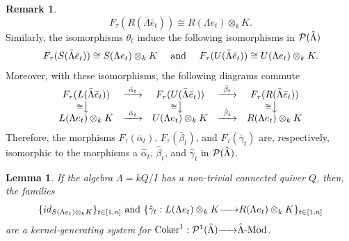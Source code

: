 \documentclass{article}
\newtheorem{lemma}[theorem]{Lemma}
\theoremstyle{definition}
\newtheorem{remark}[theorem]{Remark}
\newcommand{\Coker}{{ \rm Coker }}
\newcommand{\Mod}{{ \rm Mod }}
\newcommand{\g}{\hbox{-}}
\newcommand{\rightmap}[1]{\smash{\mathop{\hbox to 
20pt{\rightarrowfill}}\limits^{#1}}}
\newcommand{\shortlmapdown}[1]
{\llap{$\vcenter{\hbox{$\scriptstyle#1$}}$}\big\downarrow}
\begin{document}
\begin{remark}
$$F_\tau(R(\bar{\Lambda}\bar{e}_t))\cong  
R(\Lambda e_t)\otimes_k K. 
$$
 Similarly, the isomorphisms $\theta_t$ induce the following isomorphisms in ${\cal P}(\hat{\Lambda})$ 
$$F_\tau(S(\bar{\Lambda}\bar{e}_t))\cong S(\Lambda e_t)\otimes_k K \hbox{ \ \ \ and \ \ \ } F_\tau(U(\bar{\Lambda}\bar{e}_t))\cong U(\Lambda e_t)\otimes_k K.$$ Moreover, with these isomorphisms, the following diagrams  commute 
$$\begin{matrix}F_\tau(L(\bar{\Lambda}\bar{e}_t))&\rightmap{\bar{\alpha}_t}&F_\tau(U(\bar{\Lambda}\bar{e}_t))&\rightmap{\bar{\beta}_t}&F_\tau(R(\bar{\Lambda}\bar{e}_t))\\
\shortlmapdown{\cong}&&\shortlmapdown{\cong}&&\shortlmapdown{\cong}\\
L(\Lambda e_t)\otimes_kK&\rightmap{\hat{\alpha}_t}&U(\Lambda e_t)\otimes_kK&\rightmap{\hat{\beta}_t}&R(\Lambda e_t)\otimes_kK\\
\end{matrix}
$$
Therefore, the morphisms $F_\tau(\bar{\alpha}_t)$, $F_\tau(\bar{\beta}_t)$, and  $F_\tau(\bar{\gamma}_t)$ are, respectively, isomorphic to the morphisms a $\hat{\alpha}_t$,  $\hat{\beta}_t$, and $\hat{\gamma}_t$ in   ${\cal P}(\hat{\Lambda})$. 
\end{remark}

\begin{lemma}\label{L: extendidos generadores de Coker  canónicos son generadores} If the algebra $\Lambda=kQ/I$ has 
 a non-trivial connected quiver $Q$,  then,  the families  
$$
\{id_{S(\Lambda e_t)\otimes_kK}\}_{t\in [1,n]}\hbox{ and } 
\{\hat{\gamma}_t:L(\Lambda e_t)\otimes_kK\rightmap{}R(\Lambda e_t)\otimes_kK\}_{t\in [1,n]}$$
are a kernel-generating system for $\Coker^1:{\cal P}^1(\hat{\Lambda})\rightmap{}\hat{\Lambda}\g\Mod$. 
\end{lemma}
\end{document}
